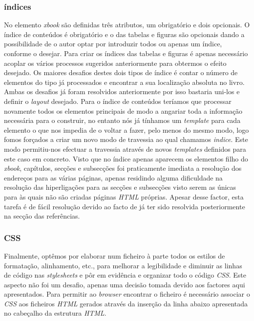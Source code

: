 \documentclass[a4paper]{article}
\begin{document}
\subsubsection{índices}

\hspace{1cm}No elemento \emph{xbook} são definidas três atributos, um obrigatório e dois opcionais. O índice de conteúdos é obrigatório e o das tabelas e figuras são opcionais dando a possibilidade de o autor optar por introduzir todos ou apenas um índice, conforme o desejar. Para criar os índices das tabelas e figuras é apenas necessário acoplar os vários processos sugeridos anteriormente para obtermos o efeito desejado. Os maiores desafios destes dois tipos de índice é contar o
número de elementos do tipo já processados e encontrar a sua localização absoluta no livro. Ambas os desafios já foram resolvidos anteriormente por isso bastaria uni-los e definir o \emph{layout} desejado. Para o índice de conteúdos teríamos que processar novamente todos os elementos principais de modo a angariar toda a informação necessária para o construir, no entanto nós já tínhamos um \emph{template} para cada elemento o que nos impedia de o voltar a fazer, pelo menos do mesmo
modo, logo fomos forçados a criar um novo modo de travessia ao qual chamamos \emph{indice}. Este modo permitiu-nos efectuar a travessia através de novos \emph{templates} definidos para este caso em concreto. Visto que no índice apenas aparecem os elementos filho do \emph{xbook}, capítulos, secções e subsecções foi praticamente imediata a resolução dos endereços para as várias páginas, apenas residindo alguma dificuldade na resolução das hiperligações para as secções e subsecções visto serem as únicas para às quais não são criadas páginas \emph{HTML} próprias. Apesar desse factor, esta tarefa é de fácil resolução devido ao facto de já ter sido resolvida posteriormente na secção das referências.\\

\subsubsection{CSS}

\hspace{1cm}Finalmente, optêmos por elaborar num ficheiro à parte todos os estilos de formatação, alinhamento, etc., para melhorar a legibilidade e diminuir as linhas de código nas \emph{stylesheets} e pôr em evidência e organizar todo o código \emph{CSS}. Este aspecto não foi um desafio, apenas uma decisão tomada devido aos factores aqui apresentados. Para permitir ao \emph{browser} encontrar o ficheiro é necessário associar o \emph{CSS} aos ficheiros \emph{HTML} gerados através da
inserção da linha abaixo apresentada no cabeçalho da estrutura \emph{HTML}.\\
\end{document}
